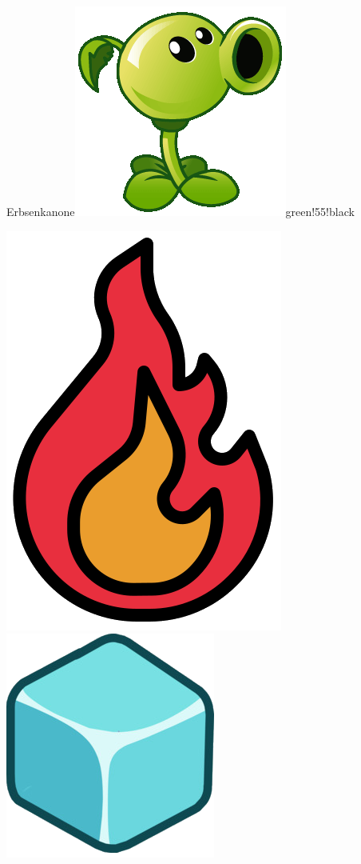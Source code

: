 \documentclass[11pt, a5paper]{article}
\def\now{\hspace{0.2cm}}
\begin{document}
\begin{mybox}{Erbsenkanone}{\includegraphics[scale=0.1]{pea}}{green!55!black}
\begin{minipage}[t]{\textwidth}
			\now\includegraphics[scale=0.075]{firef} 
			\now\includegraphics[scale=0.3]{icei} 
		\end{minipage}
	\end{mybox}
	
\end{document}
